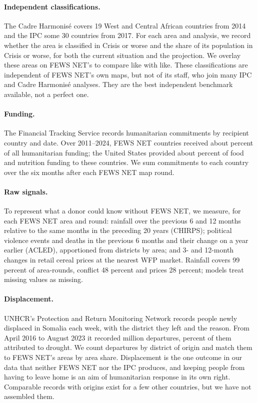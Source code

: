 \documentclass[11pt]{article}
\begin{document}
\paragraph{Independent classifications.} The Cadre Harmonis\'e covers 19 West and Central African countries from 2014 and the IPC some 30 countries from 2017. For each area and analysis, we record whether the area is classified in Crisis or worse and the share of its population in Crisis or worse, for both the current situation and the projection. We overlay these areas on FEWS NET's to compare like with like. These classifications are independent of FEWS NET's own maps, but not of its staff, who join many IPC and Cadre Harmonis\'e analyses. They are the best independent benchmark available, not a perfect one.

\paragraph{Funding.} The Financial Tracking Service records humanitarian commitments by recipient country and date. Over 2011--2024, FEWS NET countries received about \ftsShareFews{} percent of all humanitarian funding; the United States provided about \ftsUsFoodShare{} percent of food and nutrition funding to these countries. We sum commitments to each country over the six months after each FEWS NET map round.

\paragraph{Raw signals.} To represent what a donor could know without FEWS NET, we measure, for each FEWS NET area and round: rainfall over the previous 6 and 12 months relative to the same months in the preceding 20 years (CHIRPS); political violence events and deaths in the previous 6 months and their change on a year earlier (ACLED), apportioned from districts by area; and 3- and 12-month changes in retail cereal prices at the nearest WFP market. Rainfall covers 99 percent of area-rounds, conflict 48 percent and prices 28 percent; models treat missing values as missing.

\paragraph{Displacement.} UNHCR's Protection and Return Monitoring Network records people newly displaced in Somalia each week, with the district they left and the reason. From April 2016 to August 2023 it recorded \dispTotal{} million departures, \dispDroughtShare{} percent of them attributed to drought. We count departures by district of origin and match them to FEWS NET's areas by area share. Displacement is the one outcome in our data that neither FEWS NET nor the IPC produces, and keeping people from having to leave home is an aim of humanitarian response in its own right. Comparable records with origins exist for a few other countries, but we have not assembled them.
\end{document}
